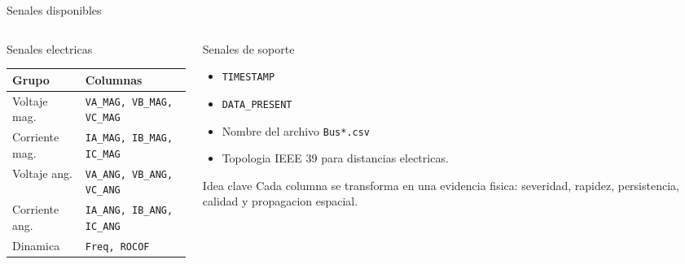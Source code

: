 \documentclass[10pt,aspectratio=169]{beamer}
\newcommand{\code}[1]{\texttt{\footnotesize #1}}
\begin{document}
\begin{frame}{Senales disponibles}
\small
\begin{columns}[T,totalwidth=\textwidth]
\begin{column}{0.50\textwidth}
\begin{block}{Senales electricas}
\begin{tabular}{ll}
\toprule
Grupo & Columnas\\
\midrule
Voltaje mag. & \code{VA\_MAG, VB\_MAG, VC\_MAG}\\
Corriente mag. & \code{IA\_MAG, IB\_MAG, IC\_MAG}\\
Voltaje ang. & \code{VA\_ANG, VB\_ANG, VC\_ANG}\\
Corriente ang. & \code{IA\_ANG, IB\_ANG, IC\_ANG}\\
Dinamica & \code{Freq, ROCOF}\\
\bottomrule
\end{tabular}
\end{block}
\end{column}
\begin{column}{0.46\textwidth}
\begin{block}{Senales de soporte}
\begin{itemize}
  \item \code{TIMESTAMP}
  \item \code{DATA\_PRESENT}
  \item Nombre del archivo \code{Bus*.csv}
  \item Topologia IEEE 39 para distancias electricas.
\end{itemize}
\end{block}
\begin{exampleblock}{Idea clave}
Cada columna se transforma en una evidencia fisica: severidad, rapidez, persistencia, calidad y propagacion espacial.
\end{exampleblock}
\end{column}
\end{columns}
\end{frame}
\end{document}
